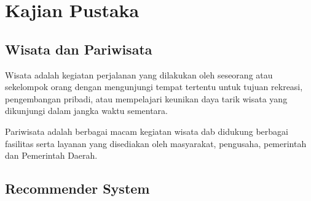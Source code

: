 \chapter{Kajian Pustaka}

\section{Wisata dan Pariwisata}
Wisata adalah kegiatan perjalanan yang dilakukan oleh seseorang atau sekelompok orang dengan mengunjungi tempat tertentu untuk tujuan rekreasi, pengembangan pribadi, atau mempelajari
keunikan daya tarik wisata yang dikunjungi dalam jangka waktu sementara.

Pariwisata adalah berbagai macam kegiatan wisata dab didukung berbagai fasilitas serta layanan yang disediakan oleh masyarakat, pengusaha, pemerintah dan Pemerintah Daerah\cite{uupariwisata}.

\section{Recommender System}

